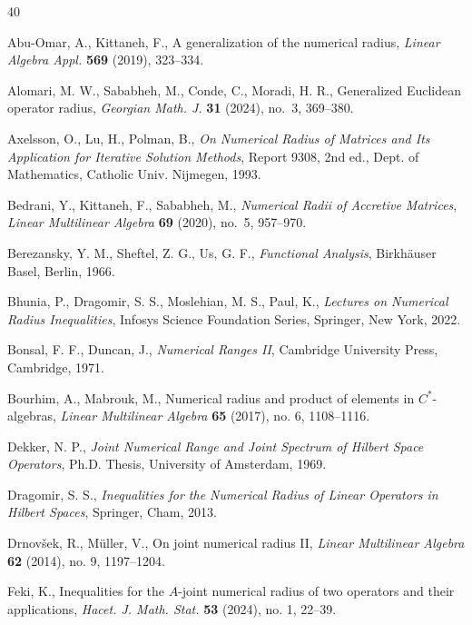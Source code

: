 \documentclass[12pt]{article}
\begin{document}
\begin{thebibliography}{40}
\footnotesize

Abu-Omar, A., Kittaneh, F.,
A generalization of the numerical radius,
\emph{Linear Algebra Appl.} \textbf{569} (2019), 323--334.

Alomari, M. W., Sababheh, M., Conde, C., Moradi, H. R.,
Generalized Euclidean operator radius,
\emph{Georgian Math. J.} \textbf{31} (2024), no.~3, 369--380.

Axelsson, O., Lu, H., Polman, B.,
\emph{On Numerical Radius of Matrices and Its Application for Iterative Solution Methods},
Report 9308, 2nd ed., Dept. of Mathematics, Catholic Univ. Nijmegen, 1993.

Bedrani, Y., Kittaneh, F., Sababheh, M.,
\emph{Numerical Radii of Accretive Matrices},
\emph{Linear Multilinear Algebra} \textbf{69} (2020), no.~5, 957--970.

Berezansky, Y. M., Sheftel, Z. G., Us, G. F.,
\emph{Functional Analysis},
Birkhäuser Basel, Berlin, 1966.

Bhunia, P., Dragomir, S. S., Moslehian, M. S., Paul, K.,
\emph{Lectures on Numerical Radius Inequalities},
Infosys Science Foundation Series, Springer, New York, 2022.

Bonsal, F. F., Duncan, J.,
\emph{Numerical Ranges II},
Cambridge University Press, Cambridge, 1971.

Bourhim, A., Mabrouk, M.,
Numerical radius and product of elements in $C^*$-algebras,
\emph{Linear Multilinear Algebra} \textbf{65} (2017), no. 6, 1108--1116.

Dekker, N. P.,
\emph{Joint Numerical Range and Joint Spectrum of Hilbert Space Operators},
Ph.D. Thesis, University of Amsterdam, 1969.

Dragomir, S. S.,
\emph{Inequalities for the Numerical Radius of Linear Operators in Hilbert Spaces},
Springer, Cham, 2013.

Drnov\v{s}ek, R., Müller, V.,
On joint numerical radius II,
\emph{Linear Multilinear Algebra} \textbf{62} (2014), no. 9, 1197--1204.

Feki, K.,
Inequalities for the $A$-joint numerical radius of two operators and their applications,
\emph{Hacet. J. Math. Stat.} \textbf{53} (2024), no. 1, 22--39.


\end{thebibliography}
\end{document}

